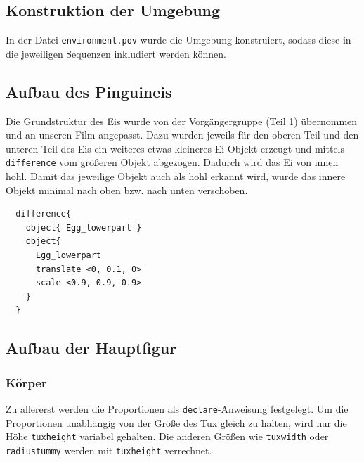 \documentclass[11pt,parskip]{scrartcl}
\begin{document}
\subsection{Konstruktion der Umgebung}
In der Datei \texttt{environment.pov} wurde die Umgebung konstruiert, sodass
diese in die jeweiligen Sequenzen inkludiert werden können.


\subsection{Aufbau des Pinguineis}
Die Grundstruktur des Eis wurde von der Vorgängergruppe (Teil 1) übernommen
und an unseren Film angepasst. Dazu wurden jeweils für den oberen Teil und den
unteren Teil des Eis ein weiteres etwas kleineres Ei-Objekt erzeugt und mittels
\texttt{difference} vom größeren Objekt abgezogen. Dadurch wird das Ei von
innen hohl. Damit das jeweilige Objekt auch als hohl erkannt wird, wurde das
innere Objekt minimal nach oben bzw. nach unten verschoben.

\begin{lstlisting}
  difference{
    object{ Egg_lowerpart }
    object{
      Egg_lowerpart
      translate <0, 0.1, 0>
      scale <0.9, 0.9, 0.9>
    }
  }
\end{lstlisting}


\subsection{Aufbau der Hauptfigur}


\subsubsection{Körper}
Zu allererst werden die Proportionen als \texttt{declare}-Anweisung festgelegt.
Um die Proportionen unabhängig von der Größe des Tux gleich zu halten, wird
nur die Höhe \texttt{tuxheight} variabel gehalten. Die anderen Größen wie
\texttt{tuxwidth} oder \texttt{radiustummy} werden mit \texttt{tuxheight}
verrechnet.
\end{document}
